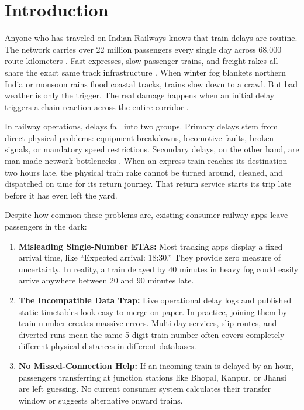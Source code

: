\documentclass[11pt,a4paper]{article}
\begin{document}
\section{Introduction}

Anyone who has traveled on Indian Railways knows that train delays are routine. The network carries over 22 million passengers every single day across 68,000 route kilometers \cite{governance2020rail}. Fast expresses, slow passenger trains, and freight rakes all share the exact same track infrastructure \cite{hansen2014railway, pachl2002railway}. When winter fog blankets northern India or monsoon rains flood coastal tracks, trains slow down to a crawl. But bad weather is only the trigger. The real damage happens when an initial delay triggers a chain reaction across the entire corridor \cite{carey1995reliability, yuan2008stochastic}.

In railway operations, delays fall into two groups. Primary delays stem from direct physical problems: equipment breakdowns, locomotive faults, broken signals, or mandatory speed restrictions. Secondary delays, on the other hand, are man-made network bottlenecks \cite{khadilkar2017data}. When an express train reaches its destination two hours late, the physical train rake cannot be turned around, cleaned, and dispatched on time for its return journey. That return service starts its trip late before it has even left the yard.

Despite how common these problems are, existing consumer railway apps leave passengers in the dark:
\begin{enumerate}[label=(\roman*)]
    \item \textbf{Misleading Single-Number ETAs:} Most tracking apps display a fixed arrival time, like ``Expected arrival: 18:30.'' They provide zero measure of uncertainty. In reality, a train delayed by 40 minutes in heavy fog could easily arrive anywhere between 20 and 90 minutes late.
    \item \textbf{The Incompatible Data Trap:} Live operational delay logs and published static timetables look easy to merge on paper. In practice, joining them by train number creates massive errors. Multi-day services, slip routes, and diverted runs mean the same 5-digit train number often covers completely different physical distances in different databases.
    \item \textbf{No Missed-Connection Help:} If an incoming train is delayed by an hour, passengers transferring at junction stations like Bhopal, Kanpur, or Jhansi are left guessing. No current consumer system calculates their transfer window or suggests alternative onward trains.
\end{enumerate}
\end{document}
